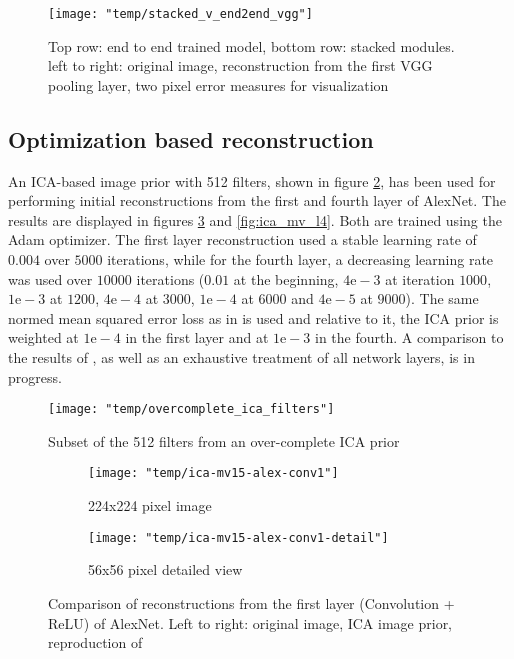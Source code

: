 \documentclass{article}
\begin{document}
\begin{figure}
	\centering
	\texttt{[image: "temp/stacked\_v\_end2end\_vgg"]}
	\caption{Top row: end to end trained model, bottom row: stacked modules. 
		left to right: original image, reconstruction from the first VGG pooling layer, two pixel error measures for visualization}
	\label{fig:stack_v_end2end}
\end{figure}



\subsection{Optimization based reconstruction}

An ICA-based image prior with 512 filters, shown in figure \ref{fig:first_ica_filters}, has been used for performing initial reconstructions from the first and fourth layer of AlexNet. The results are displayed in figures \ref{fig:ica_mv_l1} and \ref{fig:ica_mv_l4}. Both are trained using the Adam optimizer. The first layer reconstruction used a stable learning rate of $0.004$ over $5000$ iterations, while for the fourth layer, a decreasing learning rate was used over $10000$ iterations ($0.01$ at the beginning, $4\mathrm{e-}3$ at iteration $1000$, $1\mathrm{e-}3$ at $1200$, $4\mathrm{e-}4$ at $3000$, $1\mathrm{e-}4$ at $6000$ and $4\mathrm{e-}5$ at $9000$). The same normed mean squared error loss as in \cite{mv15} is used and relative to it, the ICA prior is weighted at $1\mathrm{e-}4$ in the first layer and at $1\mathrm{e-}3$ in the fourth. A comparison to the results of \cite{mv16}, as well as an exhaustive treatment of all network layers, is in progress.

\begin{figure}
	\centering
	\texttt{[image: "temp/overcomplete\_ica\_filters"]}
	\caption{Subset of the 512 filters from an over-complete ICA prior}
	\label{fig:first_ica_filters}
\end{figure}


\begin{figure}
	\centering
	\begin{subfigure}[b]{\textwidth}
		\centering
		\texttt{[image: "temp/ica-mv15-alex-conv1"]}
		\caption{224x224 pixel image}
	\end{subfigure}
	
	\begin{subfigure}[b]{\textwidth}
		\centering
		\texttt{[image: "temp/ica-mv15-alex-conv1-detail"]}
		\caption{56x56 pixel detailed view}
	\end{subfigure}
	\caption{Comparison of reconstructions from the first layer (Convolution + ReLU) of AlexNet. Left to right: original image, ICA image prior, reproduction of \cite{mv15}}
	\label{fig:ica_mv_l1}
\end{figure}
\end{document}
